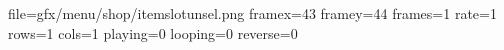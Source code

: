 file=gfx/menu/shop/itemslotunsel.png
framex=43
framey=44
frames=1
rate=1
rows=1
cols=1
playing=0
looping=0
reverse=0
